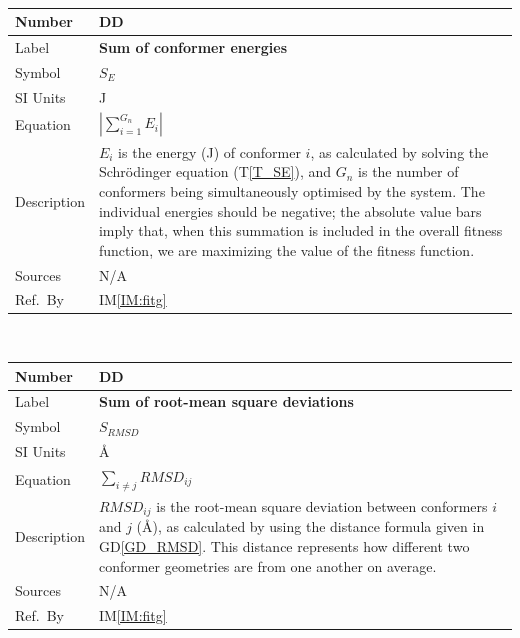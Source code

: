 \documentclass[12pt]{article}
\newcommand{\colAwidth}{0.13\textwidth}
\newcommand{\colBwidth}{0.82\textwidth}
\newcounter{defnum} %
\newcommand{\dref}[1]{GD\ref{#1}}
\newcounter{datadefnum} %
\newcommand{\iref}[1]{IM\ref{#1}}
\begin{document}
~\newline

\noindent
\begin{minipage}{\textwidth}
	\renewcommand*{\arraystretch}{1.5}
	\begin{tabular}{| p{\colAwidth} | p{\colBwidth}|}
		\hline
		\rowcolor[gray]{0.9}
		Number & DD{datadefnum}\thedatadefnum \label{Sum_E}\\
		\hline
		Label & \bf Sum of conformer energies\\
		\hline
		Symbol & $S_E$\\
		\hline
		SI Units & \si{\joule}\\
		\hline
		Equation & $\left|\sum\limits_{i=1}^{G_n}E_i\right|$ \\
		\hline
		Description & 
		$E_i$ is the energy (\si{\joule}) of conformer $i$, as calculated by 
		solving the Schr\"{o}dinger equation (T\ref{T_SE}), and $G_n$ is the 
		number of conformers being simultaneously optimised by the system. The 
		individual energies should be negative; the absolute value bars imply 
		that, when this summation is included in the overall fitness function, 
		we are maximizing the value of the fitness 
		function.
		\\
		\hline
		Sources& N/A \\
		\hline
		Ref.\ By & \iref{IM:fitg}\\
		\hline
	\end{tabular}
\end{minipage}\\

\noindent
\begin{minipage}{\textwidth}
	\renewcommand*{\arraystretch}{1.5}
	\begin{tabular}{| p{\colAwidth} | p{\colBwidth}|}
		\hline
		\rowcolor[gray]{0.9}
		Number & DD{datadefnum}\thedatadefnum \label{Sum_RMSD}\\
		\hline
		Label & \bf Sum of root-mean square deviations \\
		\hline
		Symbol & $S_{RMSD}$\\
		\hline
		SI Units & \si{\angstrom}\\
		\hline
		Equation & $\sum\limits_{i\neq j}RMSD_{ij}$ \\
		\hline
		Description & 
		$RMSD_{ij}$ is the root-mean square deviation between conformers $i$ 
		and $j$ (\si{\angstrom}), as calculated by using the distance formula 
		given in \dref{GD_RMSD}. This 
		distance represents how different two conformer geometries are from one 
		another on average.
		\\
		\hline
		Sources& N/A \\
		\hline
		Ref.\ By & \iref{IM:fitg}\\
		\hline
	\end{tabular}
\end{minipage}\\
\end{document}
